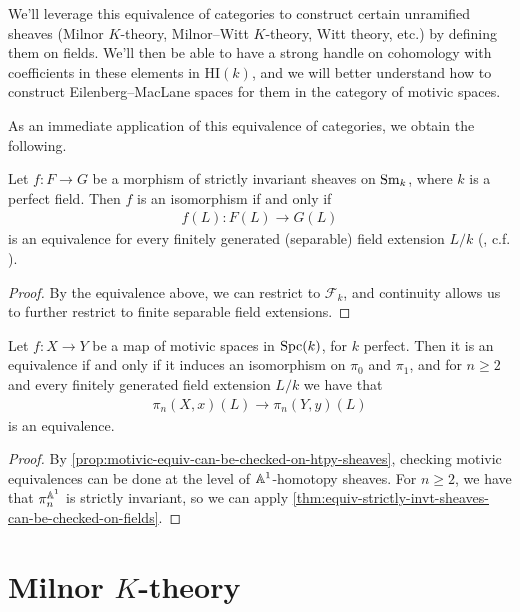 \documentclass[11pt,openany]{book}
\providecommand{\HI}{\mathrm{HI}}
\begin{document}
\begin{motivation} We'll leverage this equivalence of categories to construct certain unramified sheaves (Milnor $K$-theory, Milnor--Witt $K$-theory, Witt theory, etc.) by defining them on fields. We'll then be able to have a strong handle on cohomology with coefficients in these elements in $\HI(k)$, and we will better understand how to construct Eilenberg--MacLane spaces for them in the category of motivic spaces.
\end{motivation}

As an immediate application of this equivalence of categories, we obtain the following.

\begin{theorem}\label{thm:equiv-strictly-invt-sheaves-can-be-checked-on-fields} 
Let $f \colon F\to G$ be a morphism of strictly invariant sheaves on $\mathrm{Sm}_k$, where $k$ is a perfect field. Then $f$ is an isomorphism if and only if
\begin{align*}
    f(L) \colon F(L) \to G(L)
\end{align*}
is an equivalence for every finitely generated (separable) field extension $L/k$ (\cite[2.3,~2.8]{Morel}, c.f. \cite[2.7]{HMH}).
\end{theorem}
\begin{proof} By the equivalence above, we can restrict to $\mathcal{F}_k$, and continuity allows us to further restrict to finite separable field extensions.
\end{proof}

\begin{corollary} Let $f \colon X \to Y$ be a map of motivic spaces in $\mathrm{Spc}(k)$, for $k$ perfect. Then it is an equivalence if and only if it induces an isomorphism on $\pi_0$ and $\pi_1$, and for $n\ge 2$ and every finitely generated field extension $L/k$ we have that
\begin{align*}
    \pi_n(X,x)(L) \to \pi_n(Y,y)(L)
\end{align*}
is an equivalence.
\end{corollary}
\begin{proof} By \autoref{prop:motivic-equiv-can-be-checked-on-htpy-sheaves}, checking motivic equivalences can be done at the level of $\mathbb{A}^1$-homotopy sheaves. For $n\ge2$, we have that $\pi_n^{\mathbb{A}^1}$ is strictly invariant, so we can apply \autoref{thm:equiv-strictly-invt-sheaves-can-be-checked-on-fields}.
\end{proof}


\section{Milnor \texorpdfstring{$K$}{K}-theory}
\end{document}
